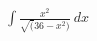 \documentclass[preview]{standalone}
\begin{document}
\begin{align*}
\int \frac{x^2}{\sqrt(36-x^2)} \ dx
\end{align*}
\end{document}
